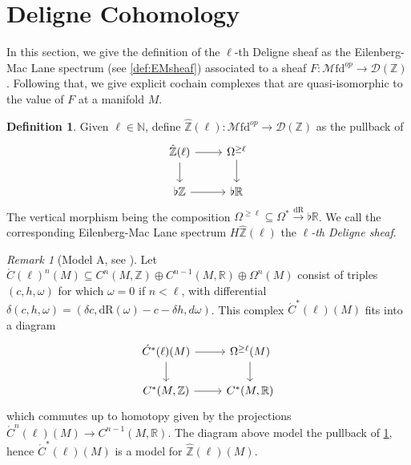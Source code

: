 \documentclass[10pt]{amsart}
\newcommand{\bA}{\mathbb{A}}
\newcommand{\D}{\mathscr{D}}
\newcommand{\bN}{\mathbb{N}}
\newcommand{\bR}{\mathbb{R}}
\newcommand{\bZ}{\mathbb{Z}}
\newcommand{\Mfd}{\mathscr{M}\mathrm{fd}}
\newcommand{\dr}{\mathrm{dR}}
\theoremstyle{definition}
\newtheorem{definition}[equation]{Definition}
\theoremstyle{remark}
\newtheorem{remark}[equation]{Remark}
\numberwithin{equation}{section}
\begin{document}

\section{Deligne Cohomology}

In this section, we give the definition of the $\ell$-th Deligne sheaf as the Eilenberg-Mac Lane spectrum (see \cref{def:EMsheaf}) associated to a sheaf $F:\Mfd^{op}\to\D(\bZ)$. Following that, we give explicit cochain complexes that are quasi-isomorphic to the value of $F$ at a manifold $M$.
\begin{definition}\label{def:deligne}
  Given $\ell\in\bN$, define $\hat{\bZ}(\ell):\Mfd^{op}\to\D(\bZ)$ as the pullback of 
  \[\begin{tikzcd}
    \hat{\bZ}(\ell)\arrow[r]\arrow[d] & \Omega^{\geq \ell}\arrow[d] \\
    \flat\bZ \arrow[r] & \flat\bR
  \end{tikzcd}\]
  The vertical morphism being the composition $\Omega^{\geq \ell}\subseteq\Omega^*\xrightarrow{\dr}\flat\bR$. We call the corresponding Eilenberg-Mac Lane spectrum $H\hat{\bZ}(\ell)$ the $\ell$\emph{-th Deligne sheaf}.
\end{definition}
\begin{remark}[Model A, see {\cite[\S 3.2]{hopkinssinger2005diffcoh}}]\label{rmk:A} Let $\acute{C}(\ell)^n(M)\subseteq C^n(M,\bZ)\oplus C^{n-1}(M,\bR)\oplus\Omega^n(M)$ consist of triples $(c,h,\omega)$ for which $\omega=0$ if $n<\ell$, with differential $\delta(c,h,\omega)=(\delta c,\dr(\omega)-c-\delta h,d\omega)$. This complex $\acute{C}^*(\ell)(M)$ fits into a diagram
\[\begin{tikzcd}
    \acute{C}^*(\ell)(M) \arrow[d]\arrow[r] & \Omega^{\geq \ell}(M)\arrow[d] \\
    C^*(M,\bZ) \arrow[r] & C^*(M,\bR)
  \end{tikzcd}\]which commutes up to homotopy given by the projections $\acute{C}^n(\ell)(M)\to C^{n-1}(M,\bR)$. The diagram above model the pullback of \cref{def:deligne}, hence $\acute{C}^*(\ell)(M)$ is a model for $\hat{\bZ}(\ell)(M)$. 
\end{remark}
\end{document}
